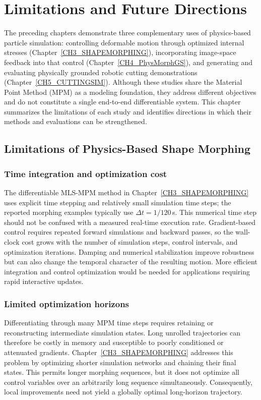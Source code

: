 
\clearpage
\chapter{Limitations and Future Directions}\label{CH6_LIMITATION}

The preceding chapters demonstrate three complementary uses of physics-based particle simulation: controlling deformable motion through optimized internal stresses (Chapter~\ref{CH3_SHAPEMORPHING}), incorporating image-space feedback into that control (Chapter~\ref{CH4_PhysMorphGS}), and generating and evaluating physically grounded robotic cutting demonstrations (Chapter~\ref{CH5_CUTTINGSIM}). Although these studies share the Material Point Method (MPM) as a modeling foundation, they address different objectives and do not constitute a single end-to-end differentiable system. This chapter summarizes the limitations of each study and identifies directions in which their methods and evaluations can be strengthened.

\section{Limitations of Physics-Based Shape Morphing}
\label{subsec:lim-mpm}

\subsection{Time integration and optimization cost}
The differentiable MLS-MPM method in Chapter~\ref{CH3_SHAPEMORPHING} uses explicit time stepping and relatively small simulation time steps; the reported morphing examples typically use $\Delta t=1/120$\,s. This numerical time step should not be confused with a measured real-time execution rate. Gradient-based control requires repeated forward simulations and backward passes, so the wall-clock cost grows with the number of simulation steps, control intervals, and optimization iterations. Damping and numerical stabilization improve robustness but can also change the temporal character of the resulting motion. More efficient integration and control optimization would be needed for applications requiring rapid interactive updates.

\subsection{Limited optimization horizons}
Differentiating through many MPM time steps requires retaining or reconstructing intermediate simulation states. Long unrolled trajectories can therefore be costly in memory and susceptible to poorly conditioned or attenuated gradients. Chapter~\ref{CH3_SHAPEMORPHING} addresses this problem by optimizing shorter simulation networks and chaining their final states. This permits longer morphing sequences, but it does not optimize all control variables over an arbitrarily long sequence simultaneously. Consequently, local improvements need not yield a globally optimal long-horizon trajectory.

